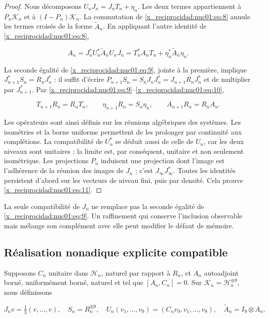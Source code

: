 \begin{proof}
Nous décomposons \(U_nJ_n=J_nT_n+\eta_n\). Les deux termes appartiennent à \(P_n\mathscr K_n\) et à \((I-P_n)\mathscr K_n\). La commutation de \eqref{x_reciprocidad:nuc01:eq:8} annule les termes croisés de la forme \(\widetilde A_n\). En appliquant l’autre identité de \eqref{x_reciprocidad:nuc01:eq:8},

\[
A_n=J_n^*U_n^*\widetilde A_nU_nJ_n
=T_n^*A_nT_n+\eta_n^*\widetilde A_n\eta_n.
\]

La seconde égalité de \eqref{x_reciprocidad:nuc01:eq:9}, jointe à la première, implique
\(J_{n+1}^*S_n=R_nJ_n^*\) : il suffit d’écrire
\(P_{n+1}S_n=S_nJ_nJ_n^*=J_{n+1}R_nJ_n^*\) et de multiplier par \(J_{n+1}^*\).
Par \eqref{x_reciprocidad:nuc01:eq:9}–\eqref{x_reciprocidad:nuc01:eq:10},

\[
T_{n+1}R_n=R_nT_n,\qquad
\eta_{n+1}R_n=S_n\eta_n,\qquad
A_{n+1}R_n=R_nA_n.
\]

Les opérateurs sont ainsi définis sur les réunions algébriques des systèmes. Les isométries et la borne uniforme permettent de les prolonger par continuité aux complétions. La compatibilité de \(U_n^*\) se déduit aussi de celle de \(U_n\), car les deux niveaux sont unitaires ; la limite est, par conséquent, unitaire et non seulement isométrique. Les projections \(P_n\) induisent une projection dont l’image est l’adhérence de la réunion des images de \(J_n\) ; c’est \(J_\infty J_\infty^*\). Toutes les identités persistent d’abord sur les vecteurs de niveau fini, puis par densité. Cela prouve \eqref{x_reciprocidad:nuc01:eq:11}.
\end{proof}

La seule compatibilité de \(J_n\) ne remplace pas la seconde égalité de \eqref{x_reciprocidad:nuc01:eq:9}. Un raffinement qui conserve l’inclusion observable mais mélange son complément avec elle peut modifier le défaut de mémoire.

\subsection{Réalisation nonadique explicite compatible}

Supposons \(C_n\) unitaire dans \(\mathscr H_n\), naturel par rapport à \(R_n\), et \(A_n\) autoadjoint borné, uniformément borné, naturel et tel que \([A_n,C_n]=0\). Sur \(\mathscr K_n=\mathscr H_n^{\oplus9}\), nous définissons

\[
J_nv=\tfrac13(v,\ldots,v),\quad
S_n=R_n^{\oplus9},\quad
U_n(v_1,\ldots,v_9)=(C_nv_9,v_1,\ldots,v_8),
\quad \widetilde A_n=I_9\otimes A_n.
\]


